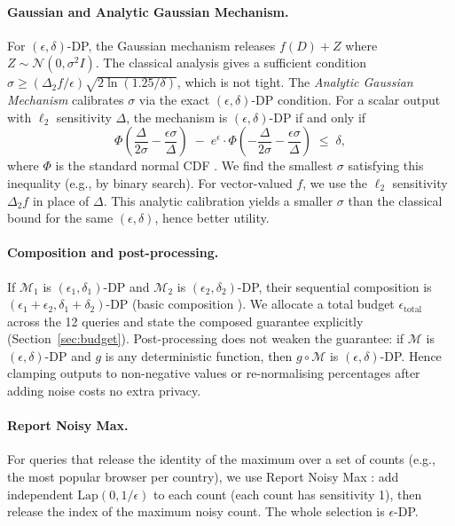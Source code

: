 \documentclass[12pt,letterpaper]{article}
\begin{document}
\paragraph{Gaussian and Analytic Gaussian Mechanism.}
For $(\epsilon,\delta)$-DP, the Gaussian mechanism releases $f(D) + Z$ where $Z \sim \mathcal{N}(0, \sigma^2 I)$. The classical analysis gives a sufficient condition $\sigma \geq (\Delta_2 f / \epsilon) \sqrt{2 \ln(1.25/\delta)}$, which is not tight. The \emph{Analytic Gaussian Mechanism} \cite{balle2018improving} calibrates $\sigma$ via the exact $(\epsilon,\delta)$-DP condition. For a scalar output with $\ell_2$ sensitivity $\Delta$, the mechanism is $(\epsilon,\delta)$-DP if and only if
\begin{equation}
\label{eq:analytic_gaussian}
\Phi\left( \frac{\Delta}{2\sigma} - \frac{\epsilon\sigma}{\Delta} \right) \;-\; e^\epsilon \cdot \Phi\left( -\frac{\Delta}{2\sigma} - \frac{\epsilon\sigma}{\Delta} \right) \;\leq\; \delta,
\end{equation}
where $\Phi$ is the standard normal CDF \cite{balle2018improving}. We find the smallest $\sigma$ satisfying this inequality (e.g., by binary search). For vector-valued $f$, we use the $\ell_2$ sensitivity $\Delta_2 f$ in place of $\Delta$. This analytic calibration yields a smaller $\sigma$ than the classical bound for the same $(\epsilon,\delta)$, hence better utility.

\paragraph{Composition and post-processing.}
If $\mathcal{M}_1$ is $(\epsilon_1,\delta_1)$-DP and $\mathcal{M}_2$ is $(\epsilon_2,\delta_2)$-DP, their sequential composition is $(\epsilon_1+\epsilon_2, \delta_1+\delta_2)$-DP (basic composition \cite{dwork2014promise}). We allocate a total budget $\epsilon_{\text{total}}$ across the 12 queries and state the composed guarantee explicitly (Section~\ref{sec:budget}). Post-processing does not weaken the guarantee: if $\mathcal{M}$ is $(\epsilon,\delta)$-DP and $g$ is any deterministic function, then $g \circ \mathcal{M}$ is $(\epsilon,\delta)$-DP. Hence clamping outputs to non-negative values or re-normalising percentages after adding noise costs no extra privacy.

\paragraph{Report Noisy Max.}
For queries that release the identity of the maximum over a set of counts (e.g., the most popular browser per country), we use Report Noisy Max \cite{dwork2014promise}: add independent $\text{Lap}(0, 1/\epsilon)$ to each count (each count has sensitivity 1), then release the index of the maximum noisy count. The whole selection is $\epsilon$-DP.
\end{document}
